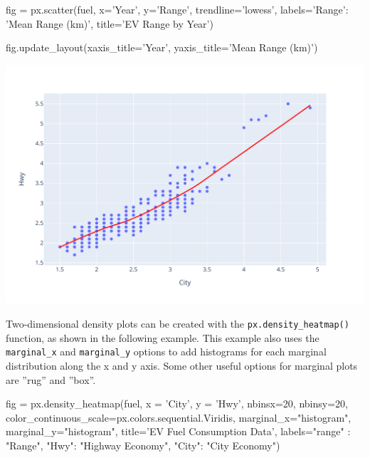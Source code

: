 \begin{samepage}
\begin{pythoncode}
fig = px.scatter(fuel, 
    x='Year', y='Range', trendline='lowess',
    labels={'Range': 'Mean Range (km)'},
    title='EV Range by Year')

fig.update_layout(xaxis_title='Year',
                  yaxis_title='Mean Range (km)')
\end{pythoncode}
\end{samepage}

\begin{center}
  \includegraphics[width=\textwidth]{px.fuel.linesSmooth.pdf}
\end{center}

Two-dimensional density plots can be created with the \texttt{px.density\_heatmap()} function, as shown in the following example. This example also uses the \texttt{marginal\_x} and \texttt{marginal\_y} options to add histograms for each marginal distribution along the x and y axis. Some other useful options for marginal plots are ''rug'' and ''box''. 

\begin{samepage}
\begin{pythoncode}
fig = px.density_heatmap(fuel,
    x = 'City', y = 'Hwy',
    nbinsx=20, nbinsy=20,
    color_continuous_scale=px.colors.sequential.Viridis,
    marginal_x="histogram",
    marginal_y="histogram",
    title='EV Fuel Consumption Data',
    labels={"range" : "Range", 
           "Hwy": "Highway Economy", 
            "City": "City Economy"})
\end{pythoncode}
\end{samepage}

